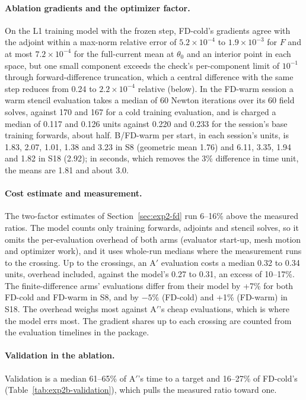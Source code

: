\documentclass{anvil-paper}
\begin{document}
\paragraph{Ablation gradients and the optimizer factor.}
On the L1 training model with the frozen step, FD-cold's gradients agree with the
adjoint within a max-norm relative error of $5.2\times10^{-4}$ to
$1.9\times10^{-3}$ for $F$ and at most $7.2\times10^{-4}$ for the
full-current mean at $\theta_0$ and an interior point in each space, but
one small component exceeds the check's per-component limit of $10^{-1}$
through forward-difference truncation, which a central difference with the
same step reduces from 0.24 to $2.2\times10^{-4}$ relative
(below). In
the FD-warm session a warm stencil evaluation takes a median of 60 Newton iterations over its 60
field solves, against 170 and 167 for a cold training evaluation, and is
charged a median of 0.117 and
0.126 units against 0.220 and 0.233 for the session's base training forwards,
about half. B/FD-warm per start, in each session's units, is 1.83,
2.07, 1.01, 1.38 and 3.23 in S8 (geometric mean 1.76) and 6.11, 3.35,
1.94 and 1.82 in S18 (2.92); in seconds, which removes the 3\%
difference in time unit, the means are 1.81 and about 3.0.

\paragraph{Cost estimate and measurement.}
The two-factor estimates of Section~\ref{sec:exp2-fd} run 6--16\% above
the measured ratios. The model counts only training forwards, adjoints and
stencil solves, so it omits the per-evaluation overhead of both arms
(evaluator start-up, mesh motion and optimizer work), and it uses
whole-run medians where the measurement runs to the crossing. Up to the
crossings, an A$'$ evaluation costs a median 0.32 to 0.34 units, overhead
included, against the model's 0.27 to 0.31, an excess of 10--17\%. The
finite-difference arms' evaluations differ from their model by +7\% for both
FD-cold and FD-warm in S8, and by $-5$\% (FD-cold) and +1\% (FD-warm) in S18. The overhead weighs most against A$'$'s cheap evaluations, which
is where the model errs most. The gradient shares up to
each crossing are counted from the evaluation timelines in the package.

\paragraph{Validation in the ablation.}
Validation is a median 61--65\% of A$'$'s time to
a target and 16--27\% of FD-cold's (Table~\ref{tab:exp2b-validation}), which
pulls the measured ratio toward one.
\end{document}
